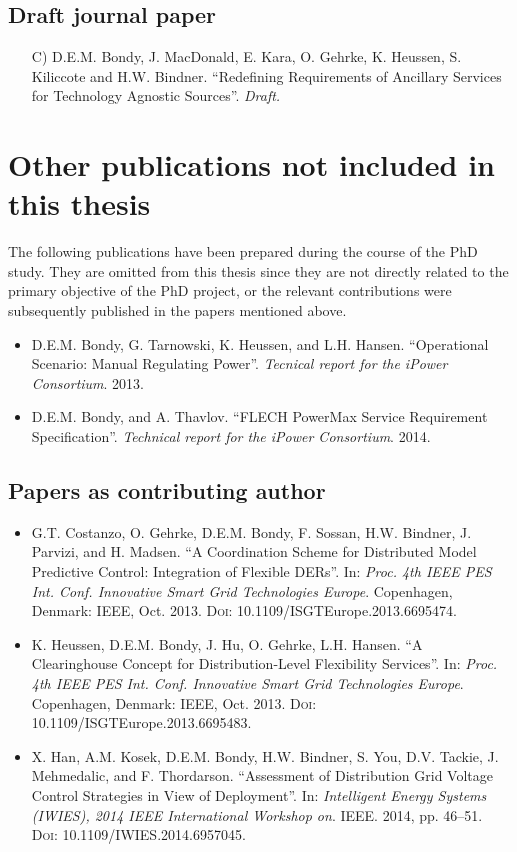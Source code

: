 \subsection*{Draft journal paper}
\begin{itemize}
\item[C)] D.E.M. Bondy, J. MacDonald, E. Kara, O. Gehrke, K. Heussen, S. Kiliccote and H.W. Bindner. ``Redefining Requirements of Ancillary Services for Technology Agnostic
	Sources''. \emph{Draft.}
\end{itemize}

\section*{Other publications not included in this thesis}
The following publications have been prepared during the course of the PhD study. They are omitted from this thesis since they are not directly related to the primary objective of the PhD project, or the relevant contributions were subsequently published in the papers mentioned above.
\begin{itemize}
	\item D.E.M. Bondy, G. Tarnowski, K. Heussen, and L.H. Hansen. ``Operational Scenario: Manual Regulating Power''. \emph{Tecnical report for the iPower Consortium}. 2013.
	\item D.E.M. Bondy, and A. Thavlov. ``FLECH PowerMax Service Requirement Specification''. \emph{Technical report for the iPower Consortium}. 2014.
\end{itemize}

\subsection*{Papers as contributing author}
\begin{itemize}
	\item G.T. Costanzo, O. Gehrke, D.E.M. Bondy, F. Sossan, H.W. Bindner, J. Parvizi, and H. Madsen. ``A Coordination Scheme for Distributed Model Predictive Control: Integration of Flexible DERs''. In: \emph{Proc. 4th IEEE PES Int. Conf. Innovative Smart Grid Technologies Europe}. Copenhagen, Denmark: IEEE, Oct. 2013. \textsc{Doi}: 10.1109/ISGTEurope.2013.6695474.
	\item K. Heussen, D.E.M. Bondy, J. Hu, O. Gehrke, L.H. Hansen. ``A Clearinghouse Concept for Distribution-Level Flexibility Services''. In: \emph{Proc. 4th IEEE PES Int. Conf. Innovative Smart Grid Technologies Europe}. Copenhagen, Denmark: IEEE, Oct. 2013. \textsc{Doi}: 10.1109/ISGTEurope.2013.6695483.
	\item X. Han, A.M. Kosek, D.E.M. Bondy, H.W. Bindner, S. You, D.V. Tackie, J. Mehmedalic, and F. Thordarson. ``Assessment of Distribution Grid Voltage Control Strategies in View of Deployment''. In: \emph{Intelligent Energy Systems (IWIES), 2014 IEEE International Workshop on}. IEEE. 2014, pp. 46–51. \textsc{Doi}: 10.1109/IWIES.2014.6957045.
\end{itemize}
